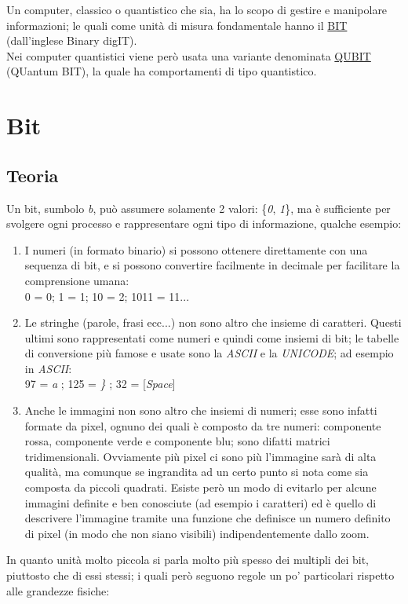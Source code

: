 Un computer, classico o quantistico che sia, ha lo scopo di gestire e manipolare informazioni; le quali come unità di misura fondamentale hanno il \underline{BIT} (dall'inglese Binary digIT).\\
Nei computer quantistici viene però usata una variante denominata \underline{QUBIT} (QUantum BIT), la quale ha comportamenti di tipo quantistico.
\section{Bit}
\subsection{Teoria}
Un bit, sumbolo \textit{b}, può assumere solamente 2 valori: \{\textit{0}, \textit{1}\}, ma è sufficiente per svolgere ogni processo e rappresentare ogni tipo di informazione, qualche esempio:
\begin{enumerate}
\item I numeri (in formato binario) si possono ottenere direttamente con una sequenza di bit, e si possono convertire facilmente in decimale per facilitare la comprensione umana:\\
\textsc{0 = 0}; \textsc{1 = 1}; \textsc{10 = 2}; \textsc{1011 = 11}...
\item Le stringhe (parole, frasi ecc...) non sono altro che insieme di caratteri. Questi ultimi sono rappresentati come numeri e quindi come insiemi di bit; le tabelle di conversione più famose e usate sono la \textit{ASCII} e la \textit{UNICODE}; ad esempio in \textit{ASCII}:\\
97 = \textit{a} ; 125 = \textit{\}} ; 32 = [\textit{Space}]\\
\item Anche le immagini non sono altro che insiemi di numeri; esse sono infatti formate da pixel, ognuno dei quali è composto da tre numeri: componente rossa, componente verde e componente blu; sono difatti matrici tridimensionali. Ovviamente più pixel ci sono più l'immagine sarà di alta qualità, ma comunque se ingrandita ad un certo punto si nota come sia composta da piccoli quadrati. Esiste però un modo di evitarlo per alcune immagini definite e ben conosciute (ad esempio i caratteri) ed è quello di descrivere l'immagine tramite una funzione che definisce un numero definito di pixel (in modo che non siano visibili) indipendentemente dallo zoom.
\end{enumerate}
In quanto unità molto piccola si parla molto più spesso dei multipli dei bit, piuttosto che di essi stessi; i quali però seguono regole un po' particolari rispetto alle grandezze fisiche:\\
